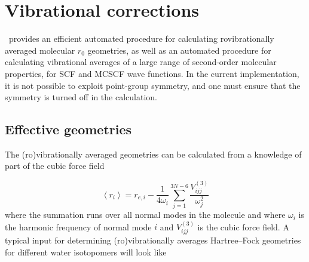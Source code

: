 \chapter{Vibrational corrections}\label{ch:vibave}

\siraba\ provides an efficient automated procedure for calculating
rovibrationally averaged molecular $r_0$ geometries, as well as an
automated procedure for calculating vibrational averages of a large
range of second-order molecular properties, for SCF and MCSCF wave
functions. In the current implementation, it is not possible to
exploit point-group symmetry, and one must ensure that the symmetry is
turned off in the calculation.

\begin{center}
\end{center}

\section{Effective geometries}\label{sec:effgeom}

The (ro)vibrationally averaged geometries can be
calculated from a knowledge of part of the cubic force field

\begin{equation}
\left<r_i\right> = r_{e,i} -
\frac{1}{4\omega_i}\sum_{j=1}^{3N-6}\frac{V^{\left(3\right)}_{ijj}}{\omega_j^2}
\end{equation}
where the summation runs over all normal modes in the molecule and
where $\omega_i$ is the harmonic frequency of normal mode $i$ and
$V^{\left(3\right)}_{ijj}$ is the cubic force field. A typical input
for determining (ro)vibrationally averages Hartree--Fock geometries
for different water isotopomers will look like

